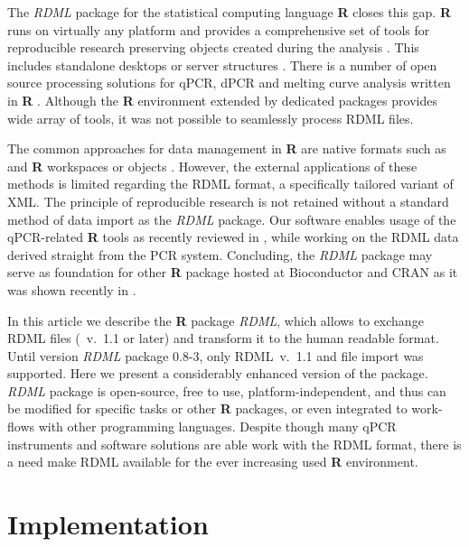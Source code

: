 \documentclass{bioinfo}
\begin{document}
The \textit{RDML} package for the statistical computing language \textbf{R} 
closes this gap. \textbf{R} runs on virtually any platform and provides a 
comprehensive set of tools for reproducible research preserving objects created 
during the analysis \cite{roediger2015r,roediger2015chippcr}. This includes 
standalone desktops or server structures \cite{roediger2015r}. There is a number 
of open source processing solutions for qPCR, dPCR and melting curve analysis 
written in \textbf{R} \cite{pabinger_2014, ritz_qpcr_2008, roediger_RJ_2013, 
roediger2015chippcr}. Although the \textbf{R} environment extended by dedicated 
packages provides wide array of tools, it was not possible to seamlessly process 
RDML files.

The common approaches for data management in \textbf{R} are native formats such 
as and \textbf{R} workspaces or objects \cite{roediger_rkward_2012}. However, 
the external applications of these methods is limited regarding the RDML format, 
a specifically tailored variant of XML. The principle of reproducible research 
is not retained without a standard method of data import as the \textit{RDML} 
package. Our software enables usage of the qPCR-related \textbf{R} tools as 
recently reviewed in \cite{pabinger_2014}, while working on the RDML data 
derived straight from the PCR system. Concluding, the \textit{RDML} package may 
serve as foundation for other \textbf{R} package hosted at Bioconductor 
\cite{gentleman_2004} and CRAN as it was shown recently in \cite{roediger2015r}.

In this article we describe the \textbf{R} package \textit{RDML}, which 
allows to exchange RDML files (~v.~1.1 or later) and transform it to the human 
readable format. Until version \textit{RDML} package 0.8-3, only RDML~v.~1.1 and 
file import was supported. Here we present a considerably enhanced version of 
the package. \textit{RDML} package is open-source, free to use, 
platform-independent, and thus can be modified for specific tasks or other 
\textbf{R} packages, or even integrated to work-flows with other programming 
languages. Despite though many qPCR instruments and software solutions are able 
work with the RDML format, there is a need make RDML available for the ever 
increasing used \textbf{R} environment.

\section{Implementation}
	
\end{document}

